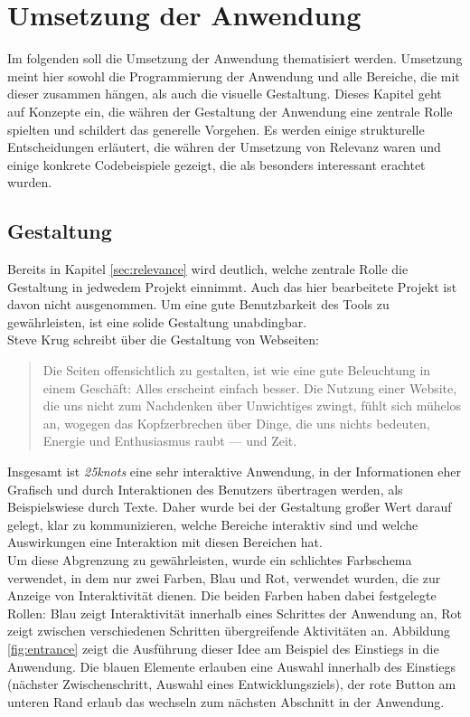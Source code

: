 \chapter{Umsetzung der Anwendung}
\thispagestyle{fancy}
Im folgenden soll die Umsetzung der Anwendung thematisiert werden. Umsetzung meint hier sowohl die Programmierung der Anwendung und alle Bereiche, die mit dieser zusammen hängen, als auch die visuelle Gestaltung. Dieses Kapitel geht auf Konzepte ein, die währen der Gestaltung der Anwendung eine zentrale Rolle spielten und schildert das generelle Vorgehen. Es werden einige strukturelle Entscheidungen erläutert, die währen der Umsetzung von Relevanz waren und einige konkrete Codebeispiele gezeigt, die als besonders interessant erachtet wurden.

\section{Gestaltung}
Bereits in Kapitel \ref{sec:relevance} wird deutlich, welche zentrale Rolle die Gestaltung in jedwedem Projekt einnimmt. Auch das hier bearbeitete Projekt ist davon nicht ausgenommen. Um eine gute Benutzbarkeit des Tools zu gewährleisten, ist eine solide Gestaltung unabdingbar.\\
Steve Krug schreibt über die Gestaltung von Webseiten:

\begin{quote}
  Die Seiten offensichtlich zu gestalten, ist wie eine gute Beleuchtung in einem Geschäft: Alles erscheint einfach besser. Die Nutzung einer Website, die uns nicht zum Nachdenken über Unwichtiges zwingt, fühlt sich mühelos an, wogegen das Kopfzerbrechen über Dinge, die uns nichts bedeuten, Energie und Enthusiasmus raubt — und Zeit. \cite[S. 19]{Krug201410}
\end{quote}

Insgesamt ist \textit{25knots} eine sehr interaktive Anwendung, in der Informationen eher Grafisch und durch Interaktionen des Benutzers übertragen werden, als Beispielswiese durch Texte.
Daher wurde bei der Gestaltung großer Wert darauf gelegt, klar zu kommunizieren, welche Bereiche interaktiv sind und welche Auswirkungen eine Interaktion mit diesen Bereichen hat.\\
Um diese Abgrenzung zu gewährleisten, wurde ein schlichtes Farbschema verwendet, in dem nur zwei Farben, Blau und Rot, verwendet wurden, die zur Anzeige von Interaktivität dienen.
Die beiden Farben haben dabei festgelegte Rollen: Blau zeigt Interaktivität innerhalb eines Schrittes der Anwendung an, Rot zeigt zwischen verschiedenen Schritten übergreifende Aktivitäten an. Abbildung \ref{fig:entrance} zeigt die Ausführung dieser Idee am Beispiel des Einstiegs in die Anwendung. Die blauen Elemente erlauben eine Auswahl innerhalb des Einstiegs (nächster Zwischenschritt, Auswahl eines Entwicklungsziels), der rote Button am unteren Rand erlaub das wechseln zum nächsten Abschnitt in der Anwendung.

